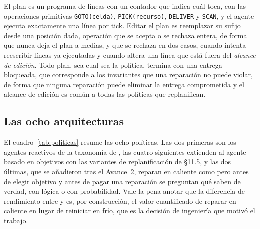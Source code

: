 El plan es un programa de líneas con un contador que indica cuál toca, con las operaciones primitivas \texttt{GOTO(celda)}, \texttt{PICK(recurso)}, \texttt{DELIVER} y \texttt{SCAN}, y el agente ejecuta exactamente una línea por tick. Editar el plan es reemplazar su sufijo desde una posición dada, operación que se acepta o se rechaza entera, de forma que nunca deja el plan a medias, y que se rechaza en dos casos, cuando intenta reescribir líneas ya ejecutadas y cuando altera una línea que está fuera del \emph{alcance de edición}. Todo plan, sea cual sea la política, termina con una entrega bloqueada, que corresponde a los invariantes que una reparación no puede violar, de forma que ninguna reparación puede eliminar la entrega comprometida y el alcance de edición es común a todas las políticas que replanifican.

\subsection{Las ocho arquitecturas}

El cuadro~\ref{tab:politicas} resume las ocho políticas. Las dos primeras son los agentes reactivos de la taxonomía de \textcite[§2.4]{russellNorvig2020}, las cuatro siguientes extienden al agente basado en objetivos con las variantes de replanificación de §11.5, y las dos últimas, que se añadieron tras el Avance~2, reparan en caliente como \CL{} pero antes de elegir objetivo y antes de pagar una reparación se preguntan qué saben de verdad, con lógica o con probabilidad. Vale la pena anotar que la diferencia de rendimiento entre \CR{} y \CL{} es, por construcción, el valor cuantificado de reparar en caliente en lugar de reiniciar en frío, que es la decisión de ingeniería que motivó el trabajo.

